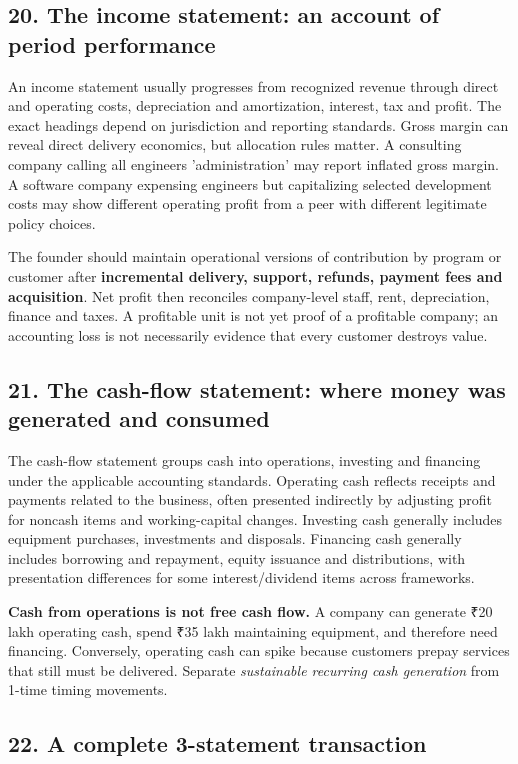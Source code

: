 \subsection{20. The income statement: an account of period performance}


An income statement usually progresses from recognized revenue through direct and operating costs, depreciation and amortization, interest, tax and profit. The exact headings depend on jurisdiction and reporting standards. Gross margin can reveal direct delivery economics, but allocation rules matter. A consulting company calling all engineers 'administration' may report inflated gross margin. A software company expensing engineers but capitalizing selected development costs may show different operating profit from a peer with different legitimate policy choices.

The founder should maintain operational versions of contribution by program or customer after \textbf{incremental delivery, support, refunds, payment fees and acquisition}. Net profit then reconciles company-level staff, rent, depreciation, finance and taxes. A profitable unit is not yet proof of a profitable company; an accounting loss is not necessarily evidence that every customer destroys value.

\subsection{21. The cash-flow statement: where money was generated and consumed}


The cash-flow statement groups cash into operations, investing and financing under the applicable accounting standards. Operating cash reflects receipts and payments related to the business, often presented indirectly by adjusting profit for noncash items and working-capital changes. Investing cash generally includes equipment purchases, investments and disposals. Financing cash generally includes borrowing and repayment, equity issuance and distributions, with presentation differences for some interest/dividend items across frameworks.

\textbf{Cash from operations is not free cash flow.} A company can generate ₹20 lakh operating cash, spend ₹35 lakh maintaining equipment, and therefore need financing. Conversely, operating cash can spike because customers prepay services that still must be delivered. Separate \textit{sustainable recurring cash generation} from 1-time timing movements.

\subsection{22. A complete 3-statement transaction}



